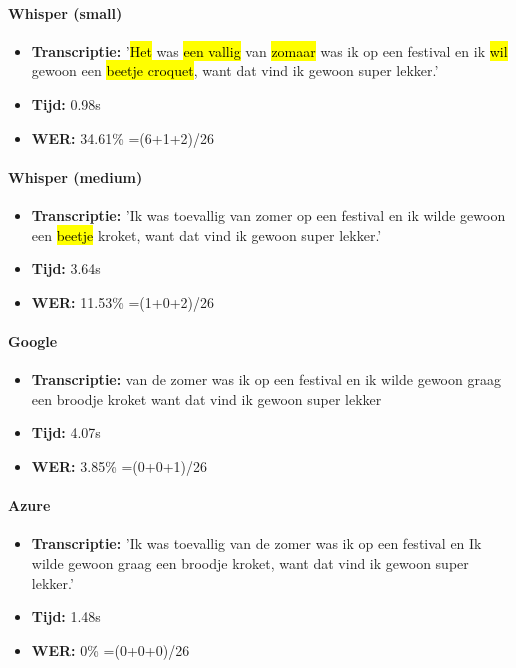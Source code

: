 \paragraph{Whisper (small)}
\begin{itemize}
    \item \textbf{Transcriptie:} '\hl{Het} was \hl{een vallig} van\hl{ zomaar} was ik op een festival en ik \hl{wil} gewoon\hl{ }een \hl{beetje croquet}, want dat vind ik gewoon super lekker.'
    \item \textbf{Tijd:} 0.98s
    \item \textbf{WER:} 34.61\% =(6+1+2)/26
\end{itemize}

\paragraph{Whisper (medium)}
\begin{itemize}
    \item \textbf{Transcriptie:} 'Ik was toevallig van\hl{ }zomer op een festival en ik wilde gewoon\hl{ }een \hl{beetje} kroket, want dat vind ik gewoon super lekker.'
    \item \textbf{Tijd:} 3.64s
    \item \textbf{WER:} 11.53\% =(1+0+2)/26
\end{itemize}

\paragraph{Google}
\begin{itemize}
\item \textbf{Transcriptie:}\hl{ }van de zomer was ik op een festival en ik wilde gewoon graag een broodje kroket want dat vind ik gewoon super lekker
\item \textbf{Tijd:} 4.07s
\item \textbf{WER:} 3.85\% =(0+0+1)/26
\end{itemize}

\paragraph{Azure}
\begin{itemize}
\item \textbf{Transcriptie:} 'Ik was toevallig van de zomer was ik op een festival en Ik wilde gewoon graag een broodje kroket, want dat vind ik gewoon super lekker.'
\item \textbf{Tijd:} 1.48s
\item \textbf{WER:} 0\% =(0+0+0)/26
\end{itemize}

